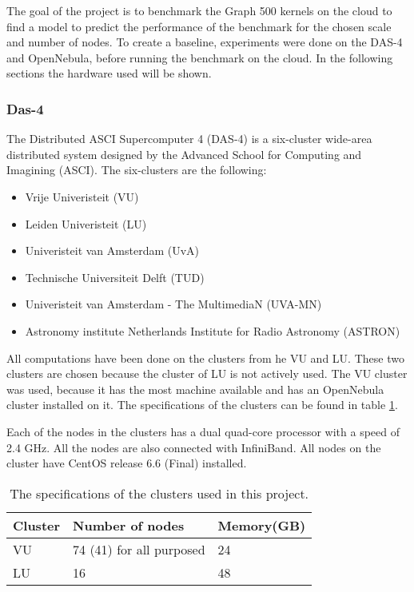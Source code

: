 
The goal of the project is to benchmark the Graph 500 kernels on the cloud to find a model to predict the performance of the benchmark for the chosen scale and number of nodes. To create a baseline, experiments were done on the DAS-4 and OpenNebula, before running the benchmark on the cloud. In the following sections the hardware used will be shown.
\subsubsection{Das-4}
\label{hw:das4}
The Distributed ASCI Supercomputer 4 (DAS-4) is a six-cluster wide-area distributed system designed by the Advanced School for Computing and Imagining (ASCI)\cite{das-4}. The six-clusters are the following:
\begin{itemize}
\item Vrije Univeristeit (VU)
\item Leiden Univeristeit (LU)
\item Univeristeit van Amsterdam (UvA) 
\item Technische Universiteit Delft (TUD)
\item Univeristeit van Amsterdam - The MultimediaN (UVA-MN) 
\item Astronomy institute Netherlands Institute for Radio Astronomy (ASTRON)
\end{itemize}
All computations have been done on the clusters from he VU and LU. These two clusters are chosen because the cluster of LU is not actively used. The VU cluster was used, because it has the most machine available and has an OpenNebula cluster installed on it. The specifications of the clusters can be found in table \ref{tab:das-clusters}. 

Each of the nodes in the clusters has a dual quad-core processor with a speed of 2.4 GHz. All the nodes are also connected with InfiniBand\cite{infiniband}. All nodes on the cluster have CentOS release 6.6 (Final) installed.
\begin{table}[!h]
	\begin{center}
\begin{tabular}{|l|l|l|}
\hline
Cluster & Number of nodes  & Memory(GB) \\ \hline
VU 		& 74 (41) for all purposed	 & 24			\\ \hline
LU		& 16 & 48 \\ \hline
\end{tabular}
\end{center}
\caption{The specifications of the clusters used in this project.}
\label{tab:das-clusters}
\end{table}



